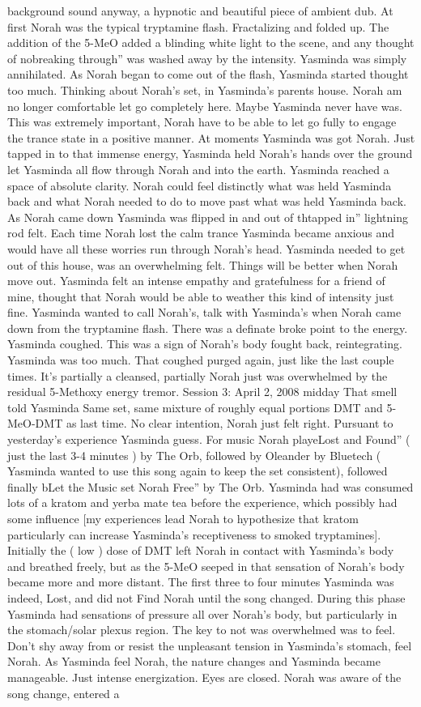 \documentclass[12pt]{book}
\begin{document}
background sound anyway, a hypnotic and beautiful piece of ambient dub. At first Norah was the typical tryptamine flash. Fractalizing and folded up. The addition of the 5-MeO added a blinding white light to the scene, and any thought of nobreaking through'' was washed away by the intensity. Yasminda was simply annihilated. As Norah began to come out of the flash, Yasminda started thought too much. Thinking about Norah's set, in Yasminda's parents house. Norah am no longer comfortable let go completely here. Maybe Yasminda never have was. This was extremely important, Norah have to be able to let go fully to engage the trance state in a positive manner. At moments Yasminda was got Norah. Just tapped in to that immense energy, Yasminda held Norah's hands over the ground let Yasminda all flow through Norah and into the earth. Yasminda reached a space of absolute clarity. Norah could feel distinctly what was held Yasminda back and what Norah needed to do to move past what was held Yasminda back. As Norah came down Yasminda was flipped in and out of thtapped in'' lightning rod felt. Each time Norah lost the calm trance Yasminda became anxious and would have all these worries run through Norah's head. Yasminda needed to get out of this house, was an overwhelming felt. Things will be better when Norah move out. Yasminda felt an intense empathy and gratefulness for a friend of mine, thought that Norah would be able to weather this kind of intensity just fine. Yasminda wanted to call Norah's, talk with Yasminda's when Norah came down from the tryptamine flash. There was a definate broke point to the energy. Yasminda coughed. This was a sign of Norah's body fought back, reintegrating. Yasminda was too much. That coughed purged again, just like the last couple times. It's partially a cleansed, partially Norah just was overwhelmed by the residual 5-Methoxy energy tremor. Session 3: April 2, 2008 midday That smell told Yasminda Same set, same mixture of roughly equal portions DMT and 5-MeO-DMT as last time. No clear intention, Norah just felt right. Pursuant to yesterday's experience Yasminda guess. For music Norah playeLost and Found'' ( just the last 3-4 minutes ) by The Orb, followed by Oleander by Bluetech ( Yasminda wanted to use this song again to keep the set consistent), followed finally bLet the Music set Norah Free'' by The Orb. Yasminda had was consumed lots of a kratom and yerba mate tea before the experience, which possibly had some influence [my experiences lead Norah to hypothesize that kratom particularly can increase Yasminda's receptiveness to smoked tryptamines]. Initially the ( low ) dose of DMT left Norah in contact with Yasminda's body and breathed freely, but as the 5-MeO seeped in that sensation of Norah's body became more and more distant. The first three to four minutes Yasminda was indeed, Lost, and did not Find Norah until the song changed. During this phase Yasminda had sensations of pressure all over Norah's body, but particularly in the stomach/solar plexus region. The key to not was overwhelmed was to feel. Don't shy away from or resist the unpleasant tension in Yasminda's stomach, feel Norah. As Yasminda feel Norah, the nature changes and Yasminda became manageable. Just intense energization. Eyes are closed. Norah was aware of the song change, entered a 
\end{document}
